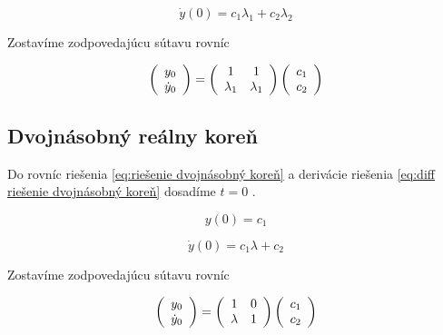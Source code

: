 \documentclass[a4paper,10pt]{article}
\begin{document}
\begin{equation}
	\dot{y}(0)= c_1\lambda_1+c_2\lambda_2
\end{equation}

Zostavíme zodpovedajúcu sútavu rovníc

\begin{equation}
\label{eq:sústava pre reálne korene}
	\left(\begin{array}{c}
		y_0\\
		\dot{y}_0\\
	\end{array}\right)=
	\left(\begin{array}{c c}
	 	1 & 1 \\
	 	\lambda_1 & \lambda_1 \\
	\end{array}\right)
	\left(\begin{array}{c}
		c_1\\
		c_2\\
	\end{array}\right)
\end{equation}


\subsection{Dvojnásobný reálny koreň}
 
Do rovníc riešenia \eqref{eq:riešenie dvojnásobný koreň} a derivácie riešenia \eqref{eq:diff riešenie dvojnásobný koreň} dosadíme $t=0$ .
 
\begin{equation}
	y(0)= c_1
\end{equation}
	
\begin{equation}
	\dot{y}(0)=c_1\lambda+c_2
\end{equation}

Zostavíme zodpovedajúcu sútavu rovníc

\begin{equation}
\label{eq:sústava pre dvojnásobný koreň}
	\left(\begin{array}{c}
		y_0\\
		\dot{y}_0\\
	\end{array}\right)=
	\left(\begin{array}{c c}
	 	1 & 0 \\
	 	\lambda & 1 \\
	\end{array}\right)
	\left(\begin{array}{c}
		c_1\\
		c_2\\
	\end{array}\right)
\end{equation}
\end{document}
